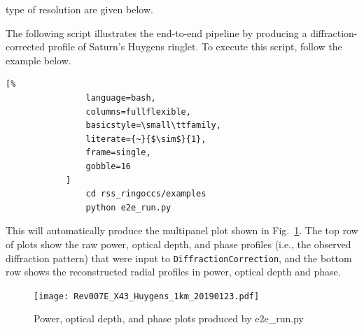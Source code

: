 \documentclass[titlepage, 12pt]{article}
\begin{document}
            type of resolution are given below.
            \par\hfill\par
            The following script illustrates the end-to-end pipeline by 
            producing a diffraction-corrected profile of Saturn's Huygens ringlet.
            To execute this script, follow the example below.
            \begin{lstlisting}[%
                language=bash,
                columns=fullflexible,
                basicstyle=\small\ttfamily,
                literate={~}{$\sim$}{1},
                frame=single,
                gobble=16
            ]
                cd rss_ringoccs/examples
                python e2e_run.py
            \end{lstlisting}
            This will automatically produce the multipanel plot shown in
            Fig.~\ref{fig:Huygens_ringlet}. The top row of plots show
            the raw power, optical depth, and phase profiles (i.e., the 
            observed diffraction pattern) that were
            input to \texttt{DiffractionCorrection}, and the bottom row
            shows the reconstructed radial profiles in power, optical depth and phase.
            \begin{figure}[ht]
                \centering
                \texttt{[image: Rev007E\_X43\_Huygens\_1km\_20190123.pdf]}
                \caption[Huygens ringlet initial testfigure]
                    {Power, optical depth, and phase plots
                     produced by e2e\_run.py} %
                \label{fig:Huygens_ringlet}
            \end{figure}
\end{document}
